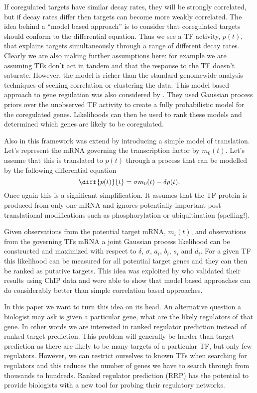 \documentclass{article}
\begin{document}
If coregulated targets have similar decay rates, they will be strongly
correlated, but  if decay  rates differ then  targets can  become more
weakly correlated.  The  idea behind a ``model based  approach'' is to
consider that  coregulated targets should conform  to the differential
equation. Thus  we see  a TF activity,  $p(t)$, that  explains targets
simultaneously through  a range of different decay  rates.  Clearly we
are also making further assumptions  here: for example we are assuming
TFs  don't act  in tandem  and  that the  response to  the TF  doesn't
saturate. However,  the model is  richer than the  standard genomewide
analysis   techniques  of  seeking   correlation  or   clustering  the
data. This model based approach to gene regulation was also considered
by \cite{Gao:}. They used  Gaussian process priors over the unobserved
TF activity to create a  fully probabilistic model for the coregulated
genes.   Likelihoods  can  then  be  used to  rank  these  models  and
determined which genes are likely to be coregulated.

Also in \cite{Gao:} this framework  was extend by introducing a simple
model  of  translation.   Let's   represent  the  mRNA  governing  the
transcription factor by $m_0(t)$. Let's assume that this is translated
to  $p(t)$ through a  process that  can be  modelled by  the following
differential equation
\[
\diff{p(t)}{t} = \sigma m_0(t) - \delta p(t).
\]
Once again this  is a significant simplification. It  assumes that the
TF  protein is  produced from  only one  mRNA and  ignores potentially
important post translational  modifications such as phosphorylation or
ubiquitination (spelling!).

Given  observations  from the  potential  target  mRNA, $m_i(t)$,  and
observations  from the  governing TFs  mRNA a  joint  Gaussian process
likelihood can be constructed  and maximized with respect to $\delta$,
$\sigma$,  $a_i$,  $b_i$,  $s_i$  and  $d_i$.  For  a  given  TF  this
likelihood can be measured for all potential target genes and they can
then  be  ranked as  putative  targets.  This  idea was  exploited  by
\cite{Honkela:} who  validated their results using ChIP  data and were
able to  show that model  based approaches can do  considerably better
than simple correlation based approaches.

In this  paper we want to turn  this idea on its  head. An alternative
question a biologist may ask is  given a particular gene, what are the
likely regulators  of that gene. In  other words we  are interested in
ranked regulator prediction instead  of ranked target prediction. This
problem will generally  be harder than target prediction  as there are
likely  to  be  many  targets   of  a  particular  TF,  but  only  few
regulators.  However, we  can  restrict ourselves  to  known TFs  when
searching for regulators and this  reduces the number of genes we have
to  search  through  from  thousands  to  hundreds.  Ranked  regulator
prediction (RRP)  has the potential  to provide biologists with  a new
tool for probing their regulatory networks.
\end{document}
